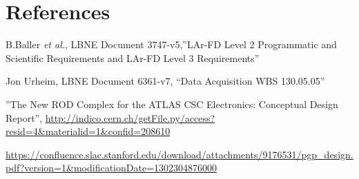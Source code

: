
\section{References}

\begin{thebibliography}{99}

 B.Baller {\it et al.}, LBNE Document 3747-v5,''LAr-FD Level 2 Programmatic and
Scientific Requirements and LAr-FD Level 3 Requirements''

 Jon Urheim, LBNE Document 6361-v7, ``Data Acquisition WBS 130.05.05''


''The New ROD Complex for the ATLAS CSC Electronics: Conceptual Design Report'',
\url{http://indico.cern.ch/getFile.py/access?resid=4&materialid=1&confid=208610}


\url{https://confluence.slac.stanford.edu/download/attachments/9176531/pgp_design.pdf?version=1&modificationDate=1302304876000}
	               
\end{thebibliography} 